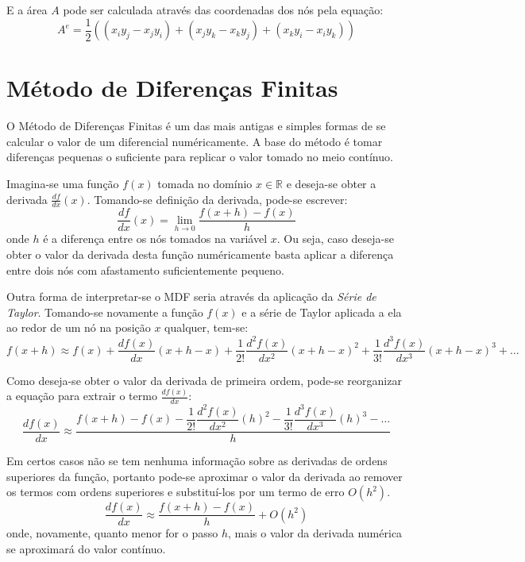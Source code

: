 E a área $A$ pode ser calculada através das coordenadas dos nós pela equação:
\begin{equation}
    A^e = \dfrac{1}{2} (
        (x_i y_j - x_j y_i) +
        (x_j y_k - x_k y_j) +
        (x_k y_i - x_i y_k)
    )
\end{equation}


\section{\textbf{Método de Diferenças Finitas}}
\label{mdf}
O Método de Diferenças Finitas é um das mais antigas e simples formas de se calcular o valor de um diferencial numéricamente.
A base do método é tomar diferenças pequenas o suficiente para replicar o valor tomado no meio contínuo.

Imagina-se uma função $f(x)$ tomada no domínio $x \in \mathbb{R}$ e deseja-se obter a derivada $\tfrac{df}{dx}(x)$.
Tomando-se definição da derivada, pode-se escrever:
\begin{equation}
    \dfrac{df}{dx}(x) = \lim_{h\to0} \dfrac{f(x+h)-f(x)}{h}
    \label{derivative}
\end{equation}
onde $h$ é a diferença entre os nós tomados na variável $x$.
Ou seja, caso deseja-se obter o valor da derivada desta função numéricamente basta aplicar a diferença entre dois nós com afastamento suficientemente pequeno.

Outra forma de interpretar-se o MDF seria através da aplicação da \textit{Série de Taylor}.
Tomando-se novamente a função $f(x)$ e a série de Taylor aplicada a ela ao redor de um nó na posição $x$ qualquer, tem-se:
\begin{equation}
    f(x + h) \approx
    f(x) +
    \dfrac{df(x)}{dx}(x + h - x) +
    \dfrac{1}{2!}\dfrac{d^2f(x)}{dx^2}(x + h - x)^2 +
    \dfrac{1}{3!}\dfrac{d^3f(x)}{dx^3}(x + h - x)^3 +
    \ldots
\end{equation}

Como deseja-se obter o valor da derivada de primeira ordem, pode-se reorganizar a equação para extrair o termo $\tfrac{df(x)}{dx}$:
\begin{equation}
    \dfrac{df(x)}{dx} \approx
    \frac{
        f(x + h) -
        f(x) -
        \dfrac{1}{2!}\dfrac{d^2f(x)}{dx^2}(h)^2 -
        \dfrac{1}{3!}\dfrac{d^3f(x)}{dx^3}(h)^3 -
        \ldots
    }{h}
\end{equation}

Em certos casos não se tem nenhuma informação sobre as derivadas de ordens superiores da função, portanto pode-se aproximar o valor da derivada ao remover os termos com ordens superiores e substituí-los por um termo de erro $O(h^2)$.
\begin{equation}
    \dfrac{df(x)}{dx} \approx
    \frac{
        f(x + h) -
        f(x)
    }{h} +
    O(h^2)
    \label{dif}
\end{equation}
onde, novamente, quanto menor for o passo $h$, mais o valor da derivada numérica se aproximará do valor contínuo.


